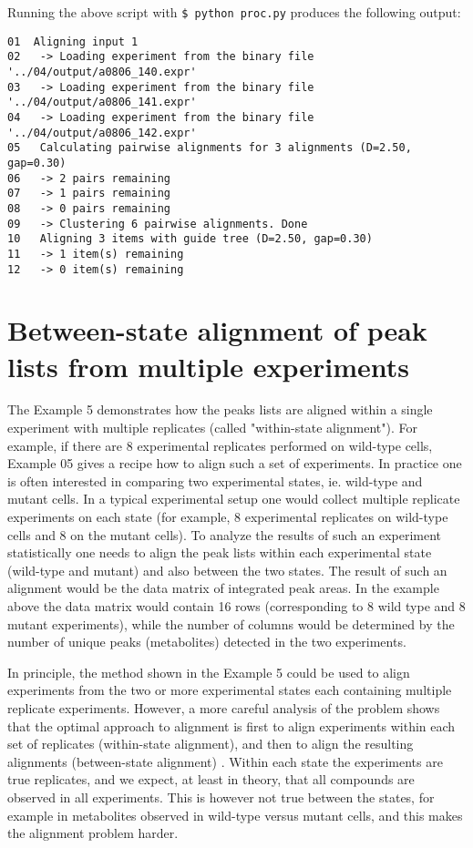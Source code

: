 Running the above script with {\tt \$ python proc.py} produces the
following output:

\begin{verbatim}
01  Aligning input 1
02   -> Loading experiment from the binary file '../04/output/a0806_140.expr'
03   -> Loading experiment from the binary file '../04/output/a0806_141.expr'
04   -> Loading experiment from the binary file '../04/output/a0806_142.expr'
05   Calculating pairwise alignments for 3 alignments (D=2.50, gap=0.30)
06   -> 2 pairs remaining
07   -> 1 pairs remaining
08   -> 0 pairs remaining
09   -> Clustering 6 pairwise alignments. Done
10   Aligning 3 items with guide tree (D=2.50, gap=0.30)
11   -> 1 item(s) remaining
12   -> 0 item(s) remaining
\end{verbatim}

\section{Between-state alignment of peak lists from multiple experiments}


The Example 5 demonstrates how the peaks lists are aligned within a single
experiment with multiple replicates (called "within-state alignment"). For
example, if there are 8 experimental replicates performed on wild-type
cells, Example 05 gives a recipe how to align such a set of experiments.
In practice one is often interested in comparing two experimental states,
ie. wild-type and mutant cells. In a typical experimental setup one would
collect multiple replicate experiments on each state (for example, 8
experimental replicates on wild-type cells and 8 on the mutant cells).
To analyze the results of such an experiment statistically one needs
to align the peak lists within each experimental state (wild-type and
mutant) and also between the two states. The result of such an alignment
would be the data matrix of integrated peak areas. In the example above
the data matrix would contain 16 rows (corresponding to 8 wild type and
8 mutant experiments), while the number of columns would be determined by
the number of unique peaks (metabolites) detected in the two experiments.

In principle, the method shown in the Example 5 could be used to align
experiments from the two or more experimental states each containing
multiple replicate experiments.  However, a more careful analysis of
the problem shows that the optimal approach to alignment is first
to align experiments within each set of replicates (within-state
alignment), and then to align the resulting alignments (between-state
alignment) \cite{Robinson07}. Within each state the experiments are
true replicates, and we expect, at least in theory, that all compounds
are observed in all experiments.  This is however not true between
the states,  for example in metabolites observed in wild-type versus
mutant cells, and this makes the alignment problem harder.


